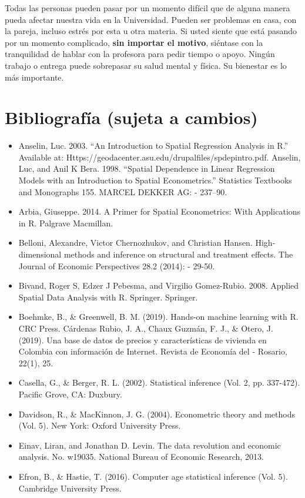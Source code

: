 \documentclass[11pt]{article}
\begin{document}
Todas las personas pueden pasar por un momento difícil que de alguna manera pueda afectar nuestra vida en la Universidad. Pueden ser problemas en casa, con la pareja, incluso estrés por esta u otra materia. Si usted siente que está pasando por un momento complicado, {\bf sin importar el motivo}, siéntase con la tranquilidad de hablar con la profesora para pedir tiempo o apoyo. Ningún trabajo o entrega puede sobrepasar su salud mental y física. Su bienestar es lo más importante.


\section{Bibliografía (sujeta a cambios)}
\begin{itemize}
\item Anselin, Luc. 2003. “An Introduction to Spatial Regression Analysis in R.” Available at: Https://geodacenter.asu.edu/drupalfiles/spdepintro.pdf.
Anselin, Luc, and Anil K Bera. 1998. “Spatial Dependence in Linear Regression Models with an Introduction to Spatial Econometrics.” Statistics Textbooks and Monographs 155. MARCEL DEKKER AG: - 237–90.
\item Arbia, Giuseppe. 2014. A Primer for Spatial Econometrics: With Applications in R. Palgrave Macmillan.
\item Belloni, Alexandre, Victor Chernozhukov, and Christian Hansen. High-dimensional methods and inference on structural and treatment effects. The Journal of Economic Perspectives 28.2 (2014): - 29-50.
\item Bivand, Roger S, Edzer J Pebesma, and Virgilio Gomez-Rubio. 2008. Applied Spatial Data Analysis with R. Springer. Springer.
\item Boehmke, B., \& Greenwell, B. M. (2019). Hands-on machine learning with R. CRC Press.
Cárdenas Rubio, J. A., Chaux Guzmán, F. J., \& Otero, J. (2019). Una base de datos de precios y características de vivienda en Colombia con información de Internet. Revista de Economía del - Rosario, 22(1), 25.
\item Casella, G., \& Berger, R. L. (2002). Statistical inference (Vol. 2, pp. 337-472). Pacific Grove, CA: Duxbury.
\item Davidson, R., \& MacKinnon, J. G. (2004). Econometric theory and methods (Vol. 5). New York: Oxford University Press.
\item Einav, Liran, and Jonathan D. Levin. The data revolution and economic analysis. No. w19035. National Bureau of Economic Research, 2013.
\item Efron, B., \& Hastie, T. (2016). Computer age statistical inference (Vol. 5). Cambridge University Press.

\end{itemize}
\end{document}
